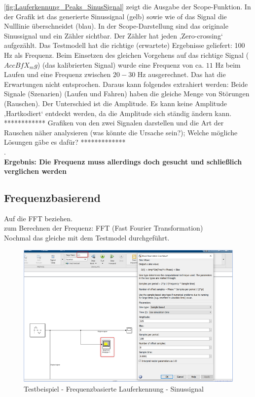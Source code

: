 \autoref{fig:Lauferkennung_Peaks_SinusSignal} zeigt die Ausgabe der Scope-Funktion. In der Grafik ist das generierte Sinussignal (gelb) sowie wie of das Signal die Nulllinie überschneidet (blau).
In der Scope-Darstellung sind das originale Sinussignal und ein Zähler sichtbar. Der Zähler hat jeden ‚Zero-crossing‘ aufgezählt.
Das Testmodell hat die richtige (erwartete) Ergebnisse geliefert: 100 Hz als Frequenz.
Beim Einsetzen des gleichen Vorgehens auf das richtige Signal ($AccBfX_mg$) (das kalibrierten Signal) wurde eine Frequenz von ca. $11$ Hz beim Laufen und eine Frequenz zwischen $20-30$ Hz ausgerechnet. Das hat die Erwartungen nicht entsprochen.
Daraus kann folgendes extrahiert werden:
Beide Signale (Szenarien) (Laufen und Fahren) haben die gleiche Menge von Störungen (Rauschen). Der Unterschied ist die Amplitude. Es kann keine Amplitude ‚Hartkodiert‘ entdeckt werden, da die Amplitude sich ständig ändern kann.
************ Grafiken von den zwei Signalen darstellen und die Art der Rauschen näher analysieren (was könnte die Ursache sein?); Welche mögliche Lösungen gäbe es dafür? *************\\

.\\

\textbf{Ergebnis: Die Frequenz muss allerdings doch gesucht und schließlich verglichen werden}




\subsection{Frequenzbasierend} %
Auf die FFT beziehen.\\

zum Berechnen der Frequenz: FFT (Fast Fourier Transformation)\\

Nochmal das gleiche mit dem Testmodel durchgeführt.\\


\begin{figure}[H]
	\centering
	\includegraphics[width=\linewidth]{Bilder/Lauferkennung_Freqbasiert_TestBeispiel_SinussignalGenerator.png}
	\caption{Testbeispiel - Frequenzbasierte Lauferkennung - Sinussignal}
	\label{fig:Lauferkennung_Freqbasiert_TestBeispiel_SinussignalGenerator}
\end{figure}

